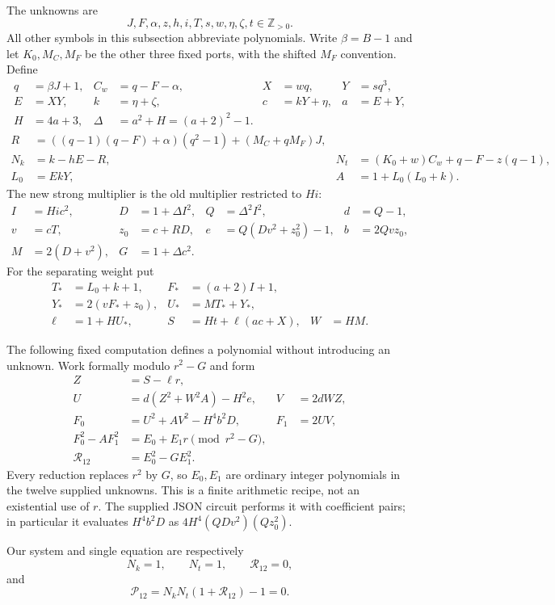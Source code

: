 The unknowns are
\[
 J,F,\alpha,z,h,i,T,s,w,\eta,\zeta,t\in\mathbb Z_{>0}.
\]
All other symbols in this subsection abbreviate polynomials.  Write
$\beta=B-1$ and let $K_0,M_C,M_F$ be the other three fixed ports,
with the shifted $M_F$ convention.  Define
\begin{align*}
 q&=\beta J+1,& C_w&=q-F-\alpha,& X&=wq,&Y&=sq^3,\\
 E&=XY,&k&=\eta+\zeta,&c&=kY+\eta,&a&=E+Y,\\
 H&=4a+3,&\Delta&=a^2+H=(a+2)^2-1.
\end{align*}
\begin{align*}
 R&=((q-1)(q-F)+\alpha)(q^2-1)+(M_C+qM_F)J,\\
 N_k&=k-hE-R,&
 N_t&=(K_0+w)C_w+q-F-z(q-1),\\
 L_0&=EkY,& A&=1+L_0(L_0+k).
\end{align*}
The new strong multiplier is the old multiplier restricted to $Hi$:
\begin{align*}
 I&=Hic^2,& D&=1+\Delta I^2,&Q&=\Delta^2I^2,&d&=Q-1,\\
 v&=cT,&z_0&=c+RD,& e&=Q(Dv^2+z_0^2)-1,&b&=2Qvz_0,\\
 M&=2(D+v^2),&G&=1+\Delta c^2.
\end{align*}
For the separating weight put
\begin{align*}
 T_*&=L_0+k+1,&F_*&=(a+2)I+1,\\
 Y_*&=2(vF_*+z_0),&U_*&=MT_*+Y_*,\\
 \ell&=1+HU_*,&S&=Ht+\ell(ac+X),&W&=HM.
\end{align*}

The following fixed computation defines a polynomial without introducing
an unknown.  Work formally modulo $r^2-G$ and form
\begin{align*}
 Z&=S-\ell r,\\
 U&=d(Z^2+W^2A)-H^2e,& V&=2dWZ,\\
 F_0&=U^2+AV^2-H^4b^2D,&F_1&=2UV,\\
 F_0^2-AF_1^2&=E_0+E_1r\pmod{r^2-G},\\
 \mathcal R_{12}&=E_0^2-GE_1^2.
\end{align*}
Every reduction replaces $r^2$ by $G$, so $E_0,E_1$ are ordinary
integer polynomials in the twelve supplied unknowns.  This is a finite
arithmetic recipe, not an existential use of $r$.  The supplied JSON
circuit performs it with coefficient pairs; in particular it evaluates
$H^4b^2D$ as $4H^4(QDv^2)(Qz_0^2)$.

Our system and single equation are respectively
\begin{equation}
 N_k=1,\qquad N_t=1,\qquad\mathcal R_{12}=0,
 \label{eq:twelve-system}
\end{equation}
and
\begin{equation}
 \boxed{\mathcal P_{12}=N_kN_t(1+\mathcal R_{12})-1=0.}
 \label{eq:twelve-product}
\end{equation}

